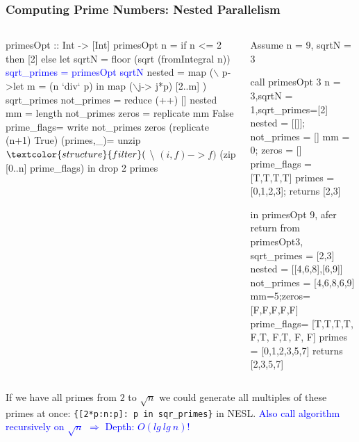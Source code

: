 \documentclass{beamer}
\newcommand{\blue}[1]{\textcolor{Blue}{{#1}}}
\renewcommand{\emph}[1]{\textcolor{structure}{#1}}
\newcommand{\emp}[1]{\textcolor{DikuRed}{ #1}}
\newcommand{\mymath}[1]{$ #1 $}
\begin{document}
\begin{frame}[fragile,t]
  \frametitle{Computing Prime Numbers: Nested Parallelism}

\begin{columns}
\begin{colorcode}[fontsize=\scriptsize]
primesOpt :: Int -> [Int]
primesOpt n = 
  if n <= 2 then [2]
  else 
   let sqrtN = floor (sqrt (fromIntegral n))
       \blue{sqrt_primes = primesOpt sqrtN}
       nested = \emp{map} (\mymath{\backslash}\emp{p}->let m = (n `div` p) 
                         in  \emp{map} (\mymath{\backslash}j-> j*p)
                                 [2..m]
                    ) \emp{sqrt_primes}
       not_primes  = \emph{reduce} (++) [] nested
       mm = length not_primes
       zeros = \emph{replicate} mm False 
       prime_flags= \emph{write} not_primes zeros 
                    \emph{(replicate} (n+1) True)
       (primes,_)= unzip $ \emph{filter} (\mymath{\backslash}(i,f)->f) 
                    $ (zip [0..n] prime_flags)
   in drop 2 primes
\end{colorcode}
\pause
\begin{colorcode}[fontsize=\scriptsize]
Assume n = 9, sqrtN = 3 

call primesOpt 3
n = 3,sqrtN = 1,sqrt_primes=[2]
nested = [[]]; not\_primes = [] 
mm = 0; zeros = []
prime_flags = [T,T,T,T]
primes = [0,1,2,3]; returns [2,3]

in primesOpt 9, afer 
return from primesOpt3,
sqrt_primes = [2,3]
nested = [[4,6,8],[6,9]]
not_primes = [4,6,8,6,9]
mm=5;zeros= [F,F,F,F,F]
prime_flags= [T,T,T,T,\emp{F},T,\emp{F},T,\emp{F},\emp{F}]
primes = [0,1,2,3,5,7]
returns [2,3,5,7]
\end{colorcode}
\end{columns}
\medskip

If we have all primes from $2$ to $\sqrt{n}$ we could
generate all multiples of these primes at once:
\emp{\tt \{[2*p:n:p]: p in sqr\_primes\}} in NESL.
\blue{Also call algorithm recursively on $\sqrt{n}$ $\Rightarrow$ Depth: $O(lg \ lg \ n)$!}
\end{frame}
\end{document}
